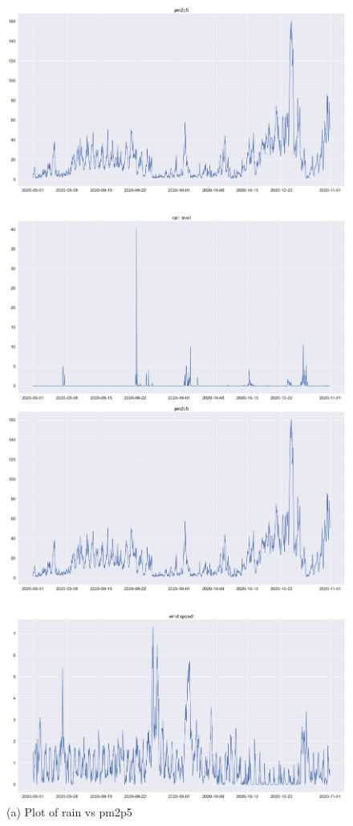 \documentclass{article}
\begin{document}
 \begin{figure}[h!]
    \centering
    \begin{minipage}[t]{0.4\textwidth}
      \centering
      \includegraphics[scale=0.18]{plotpioggia.png}
      \caption{(a) Plot of rain vs pm2p5}
    \end{minipage}\hfill
    \begin{minipage}[t]{0.4\textwidth}
      \centering
      \includegraphics[scale=0.18]{plotwind.png}

\end{minipage}
\end{figure}
\end{document}
